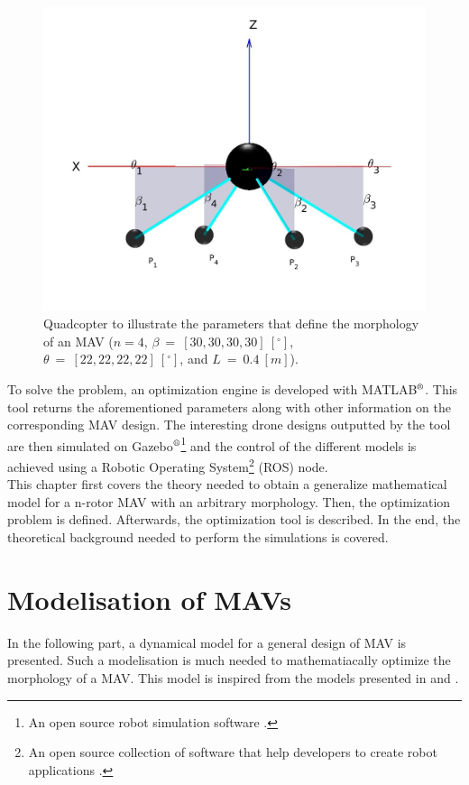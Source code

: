 \begin{figure}[h]
\begin{minipage}[t]{0.3\textwidth}
  \centering
  \includegraphics[width=\textwidth]{images/drone_design2.jpg}
\end{minipage}
\caption{Quadcopter to illustrate the parameters that define the morphology of an
MAV ($n = 4$, $\beta\ =\ [30, 30, 30, 30]\ [^{\circ}]$, $\theta\ =\ [22, 22, 22, 22]\
[^{\circ}]$, and $L\ =\ 0.4\ [m]$).}
\label{fig:drone_design}
\end{figure}

To solve the problem, an optimization engine is developed with
MATLAB$^\textrm{\textregistered}$. This tool returns the aforementioned
parameters along with other information on the corresponding MAV design.
The interesting drone designs outputted by the tool are then simulated on
Gazebo$^\textrm{\textregistered}$\footnote{An open source robot simulation software \citep{noauthor_gazebo_nodate}.}
and the control of the different models is achieved using a Robotic Operating
System\footnote{An open source collection of software that help developers to
create robot applications \citep{rostutorials}.} (ROS) node.\\
This chapter first covers the theory needed to obtain a generalize mathematical
model for a n-rotor MAV with an arbitrary morphology. Then, the optimization
problem is defined. Afterwards, the optimization tool is described. In the end,
the theoretical background needed to perform the simulations is covered.

\section{Modelisation of MAVs}
\label{sec:modeling_mav}
In the following part, a dynamical model for a general design of MAV is presented.
Such a modelisation is much needed to mathematiacally optimize the morphology of
a MAV. This model is inspired from the models presented in
\citep{kamel_voliro:_2018} and \citep{ryll_modeling_2012}.

